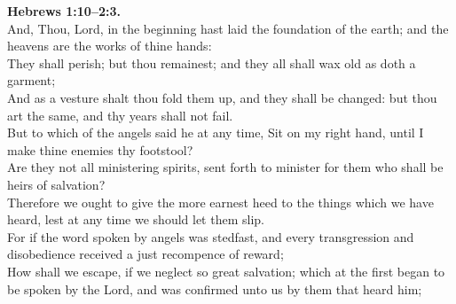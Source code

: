 \documentclass[10pt]{article} %
\begin{document}
{\begin{minipage}[t]{0.45\textwidth}
\textbf{Hebrews 1:10--2:3.}\\
And, Thou, Lord, in the beginning hast laid the foundation of the earth; and the heavens are the works of thine hands:\\
They shall perish; but thou remainest; and they all shall wax old as doth a garment;\\
And as a vesture shalt thou fold them up, and they shall be changed: but thou art the same, and thy years shall not fail.\\
But to which of the angels said he at any time, Sit on my right hand, until I make thine enemies thy footstool?\\
Are they not all ministering spirits, sent forth to minister for them who shall be heirs of salvation?\\
Therefore we ought to give the more earnest heed to the things which we have heard, lest at any time we should let them slip.\\
For if the word spoken by angels was stedfast, and every transgression and disobedience received a just recompence of reward;\\
How shall we escape, if we neglect so great salvation; which at the first began to be spoken by the Lord, and was confirmed unto us by them that heard him;\\

\end{minipage}}
\vspace*{\fill}
\newpage
\Huge%
\vspace*{\fill}
\begin{spacing}{1.3}%
\end{spacing}
\vspace*{\fill}
\end{document}
